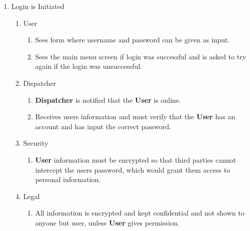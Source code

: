 \documentclass[english]{article}
\begin{document}
\begin{enumerate}[{BE}1.]
	\item Login is Initiated
	\begin{enumerate}[{VP3}.1]
		\item User
			\begin{enumerate}
				\item Sees form where username and password can be given as input.
				\item Sees the main menu screen if login was successful and is asked to try again if the login was unsuccessful.
			\end{enumerate}
		\item Dispatcher
			\begin{enumerate}
				\item \textbf{Dispatcher} is notified that the \textbf{User} is online.
				\item Receives users information and must verify that the \textbf{User} has an account and has input the correct password.
			\end{enumerate}
		\item Security
			\begin{enumerate}
				\item \textbf{User} information must be encrypted so that third parties cannot intercept the users password, which would grant them access to personal information.
			\end{enumerate}
		\item Legal
			\begin{enumerate}
				\item All information is encrypted and kept confidential and not shown to anyone but user, unless \textbf{User} gives permission.
			\end{enumerate}
	\end{enumerate}


\end{enumerate}
\end{document}
